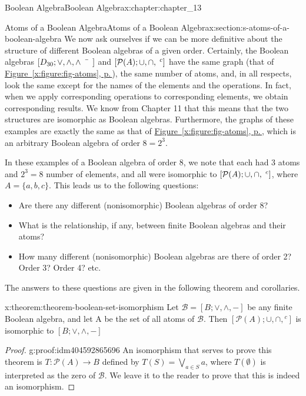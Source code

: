 \documentclass[twoside,10pt,]{book}
\newcommand{\xreffont}{\relax}
\numberwithin{equation}{section}
\begin{document}
\begin{chapterptx}{Boolean Algebra}{}{Boolean Algebra}{}{}{x:chapter:chapter_13}
\begin{sectionptx}{Atoms of a Boolean Algebra}{}{Atoms of a Boolean Algebra}{}{}{x:section:s-atoms-of-a-boolean-algebra}
We now ask ourselves if we can be more definitive about the structure of different Boolean algebras of a given order. Certainly, the Boolean algebras \(\left[D_{30}; \lor , \land, \land\bar{\hspace{5 mm}} \right]\) and \([\mathcal{P}(A);  \cup , \cap, \hspace{1 mm}^c]\) have the same graph (that of \hyperref[x:figure:fig-atoms]{Figure~{\xreffont\ref{x:figure:fig-atoms}}, p.\,\pageref{x:figure:fig-atoms}}), the same number of atoms, and, in all respects, look the same except for the names of the elements and the operations. In fact, when we apply corresponding operations to corresponding elements, we obtain corresponding results. We know from Chapter 11 that this means that the two structures are isomorphic as Boolean algebras. Furthermore, the graphs of these examples are exactly the same as that of \hyperref[x:figure:fig-atoms]{Figure~{\xreffont\ref{x:figure:fig-atoms}}, p.\,\pageref{x:figure:fig-atoms}}, which is an arbitrary Boolean algebra of order \(8 = 2^3\).%
\par
In these examples of a Boolean algebra of order 8, we note that each had 3 atoms and \(2^3 = 8\) number of elements, and all were isomorphic to \([\mathcal{P}(A ); \cup , \cap, \hspace{1 mm}^c]\), where \(A = \{a, b, c\}\). This leads us to the following questions:%
\begin{itemize}[label=\textbullet]
\item{}Are there any different (nonisomorphic) Boolean algebras of order 8?%
\item{}What is the relationship, if any, between finite Boolean algebras and their atoms?%
\item{}How many different (nonisomorphic) Boolean algebras are there of order 2? Order 3? Order 4? etc.%
\end{itemize}
%
\par
The answers to these questions are given in the following theorem and corollaries.%
\begin{theorem}{}{}{x:theorem:theorem-boolean-set-isomorphism}%
Let \(\mathcal{B}=[B; \lor, \land, -]\) be any finite Boolean algebra, and let A be the set of all atoms of \(\mathcal{B}\). Then \([\mathcal{P}(A); \cup, \cap, {}^c]\)  is isomorphic to \([B; \lor, \land, -]\)%
\end{theorem}
\begin{proof}{}{g:proof:idm404592865696}
An isomorphism that serves to prove this theorem is \(T:\mathcal{P}(A) \to B \) defined by \(T(S)= \bigvee_{a \in S}{a}\), where \(T(\emptyset)\) is interpreted as the zero of  \(\mathcal{B}\).  We leave it to the reader to prove that this is indeed an isomorphism.%

\end{proof}
\end{sectionptx}
\end{chapterptx}
\end{document}
